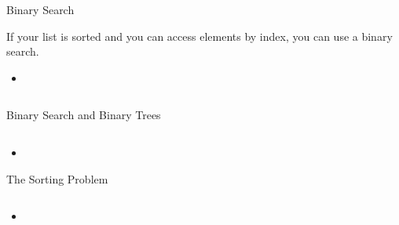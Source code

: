 \documentclass{beamer}
\begin{document}
\begin{frame}[fragile]{Binary Search}


If your list is sorted and you can access elements by index, you can use a binary search.
\begin{itemize}
\item
\end{itemize}

\begin{lstlisting}[language=Java]

\end{lstlisting}


\end{frame}


\begin{frame}[fragile]{Binary Search and Binary Trees}


\begin{lstlisting}[language=Java]

\end{lstlisting}

\begin{itemize}
\item
\end{itemize}


\end{frame}


\begin{frame}[fragile]{The Sorting Problem}


\begin{lstlisting}[language=Java]

\end{lstlisting}

\begin{itemize}
\item
\end{itemize}


\end{frame}
\end{document}
